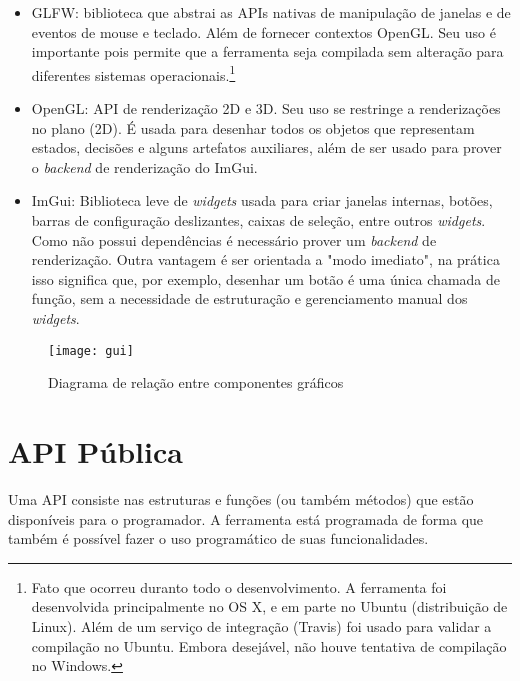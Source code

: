 \begin{itemize}
  \item GLFW: biblioteca que abstrai as APIs nativas de manipulação de janelas e
    de eventos de mouse e teclado.  Além de fornecer contextos OpenGL.  Seu uso
    é importante pois permite que a ferramenta seja compilada sem alteração para
    diferentes sistemas operacionais.\footnote{Fato que ocorreu duranto todo o
      desenvolvimento.  A ferramenta foi desenvolvida principalmente no OS X, e
      em parte no Ubuntu (distribuição de Linux).  Além de um serviço de
      integração (Travis) foi usado para validar a compilação no Ubuntu.  Embora
    desejável, não houve tentativa de compilação no Windows.} \nocite{glfwdocs}
  \item OpenGL: API de renderização 2D e 3D.  Seu uso se restringe a
    renderizações no plano (2D).  É usada para desenhar todos os objetos que
    representam estados, decisões e alguns artefatos auxiliares, além de ser
    usado para prover o \textit{backend} de renderização do ImGui.
    \nocite{opengldocs}
  \item ImGui: Biblioteca leve de \textit{widgets} usada para criar janelas
    internas, botões, barras de configuração deslizantes, caixas de seleção,
    entre outros \textit{widgets}.  Como não possui dependências é necessário
    prover um \textit{backend} de renderização.  Outra vantagem é ser orientada
    a "modo imediato", na prática isso significa que, por exemplo, desenhar um
    botão é uma única chamada de função, sem a necessidade de estruturação e
    gerenciamento manual dos \textit{widgets}. \nocite{imguigithub}
\end{itemize}

\begin{figure}[H]
  \centering
  \texttt{[image: gui]}
  \caption{Diagrama de relação entre componentes gráficos}\label{fig:arch_gui}
\end{figure}


\section{API Pública}


Uma API consiste nas estruturas e funções (ou também métodos) que estão
disponíveis para o programador.  A ferramenta está programada de forma que
também é possível fazer o uso programático de suas funcionalidades.

